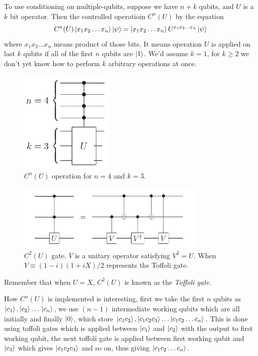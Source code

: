 To use conditioning on multiple-qubits, suppose we have $n+k$ qubits, and $U$ is a $k$ bit operator. Then the controlled operatioin $C^n(U)$ by the equation
\begin{equation}
    C^n(U)\ket{x_1x_2\dots x_n}\ket{\psi} = \ket{x_1x_2\dots x_n}U^{x_1x_2\dots x_n}\ket{\psi}
\end{equation}
where $x_1x_2\dots x_n$ means product of those bits. It means operation $U$ is applied on last $k$ qubits if all of the first $n$ qubits are $\ket{1}$. We'd assume $k=1$, for $k\geq2$ we don't yet know how to perform $k$ arbitrary operations at once.
\begin{figure}[H]
    \centering
    \includegraphics[width=0.4\textwidth]{images/multi_qubit_operation_circuit.png}
    \caption{$C^n(U)$ operation for $n=4$ and $k=3$.}
    \label{fig:multi-qubit-operation}
\end{figure}

\begin{figure}[H]
    \centering
    \includegraphics[width=0.8\textwidth]{images/c2u_gate.png}
    \caption{$C^2(U)$ gate. $V$ is a unitary operator satisfying $V^2=U$. When $V\equiv (1-i)(1+iX)/2$ represents the Toffoli gate.}
    \label{fig:c2u}
\end{figure}
Remember that when $U=X$, $C^2(U)$ is known as the \textit{Toffoli gate}.

How $C^n(U)$ is implemented is interesting, first we take the first $n$ qubits as $\ket{c_1},\ket{c_2}\dots \\ \ket{c_n}$, we use $(n-1)$ intermediate working qubits which are all initially and finally $\ket{0}$, which store $\ket{c_1c_2},\ket{c_1c_2c_3}\dots \ket{c_1c_2\dots c_n}$. This is done using toffoli gates which is applied between $\ket{c_1}$ and $\ket{c_2}$ with the output to first working qubit, the next toffoli gate is applied between first working qubit and $\ket{c_3}$ which gives $\ket{c_1c_2c_3}$ and so on, thus giving $\ket{c_1c_2\dots c_n}$.

